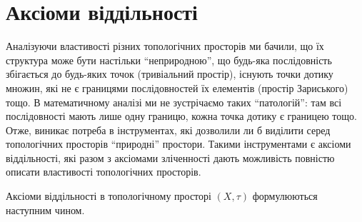 \documentclass[a4paper, 12pt]{article}
\begin{document}
\setcounter{section}{3}

\section{Аксіоми віддільності}

Аналізуючи властивості різних топологічних просторів
ми бачили, що їх структура може бути настільки
``неприродною'', що будь-яка послідовність збігається до
будь-яких точок (тривіальний простір), існують точки
дотику множин, які не є границями послідовностей їх
елементів (простір Зариського) тощо. В математичному
аналізі ми не зустрічаємо таких ``патологій'': там всі
послідовності мають лише одну границю, кожна точка
дотику є границею тощо. Отже, виникає потреба в
інструментах, які дозволили ли б виділити серед
топологічних просторів ``природні'' простори. Такими
інструментами є аксіоми віддільності, які разом з аксіомами
зліченності дають можливість повністю описати
властивості топологічних просторів. \medskip

Аксіоми віддільності в топологічному просторі $(X, \tau)$
формулюються наступним чином.
\end{document}
